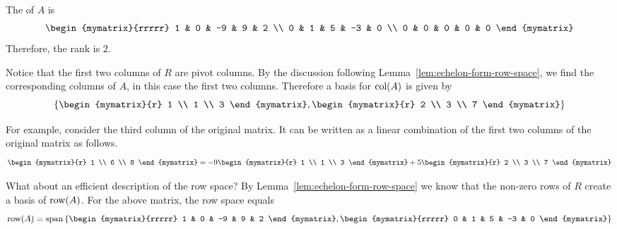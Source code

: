 \begin{solution}
The {\rref} of $A$ is 
\begin{equation*}
\begin{mymatrix}{rrrrr}
1 & 0 & -9 & 9 & 2 \\ 
0 & 1 & 5 & -3 & 0 \\ 
0 & 0 & 0 & 0 & 0
\end{mymatrix} 
\end{equation*}
Therefore, the rank is $2$.

Notice that the first two columns of $R$ are pivot columns. By the discussion following Lemma~\ref{lem:echelon-form-row-space}, we find the corresponding columns of $A$, in this case the first two columns. Therefore a basis for $\mbox{\rm col}(A)$ is given by
\[
\set{\begin{mymatrix}{r}
1 \\ 
1 \\ 
3
\end{mymatrix} , \begin{mymatrix}{r}
2 \\ 
3 \\ 
7
\end{mymatrix}
}
\] 

 For
example, consider the third column of the original matrix. It can be written as a linear combination of the first two columns of the original matrix as follows.
\begin{equation*}
\begin{mymatrix}{r}
1 \\ 
6 \\ 
8
\end{mymatrix} =-9\begin{mymatrix}{r}
1 \\ 
1 \\ 
3
\end{mymatrix} +5\begin{mymatrix}{r}
2 \\ 
3 \\ 
7
\end{mymatrix} 
\end{equation*}

What about an efficient description of the row space? By Lemma~\ref{lem:echelon-form-row-space} we know that the non-zero rows of $R$ create a basis of $\mbox{\rm row}(A)$.  For the above matrix, the row space equals 
\[
\func{row}(A) = 
\sspan \set{
\begin{mymatrix}{rrrrr}
1 & 0 & -9 & 9 & 2
\end{mymatrix}, \begin{mymatrix}{rrrrr}
0 & 1 & 5 & -3 & 0
\end{mymatrix}
}
\]
\end{solution}

